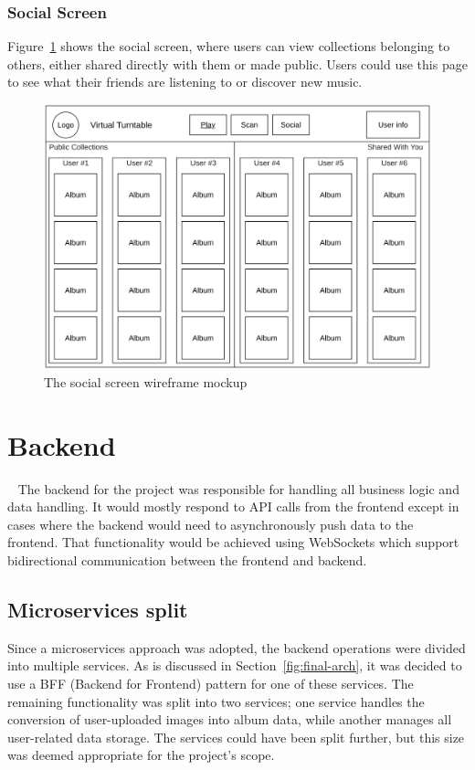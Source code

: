 \subsubsection{Social Screen}
Figure~\ref{fig:social_screen_mockup} shows the social screen, where users can view collections belonging to others, either shared directly with them or made public. Users could use this page to see what their friends are listening to or discover new music.

\begin{figure} [H]
    \centering
    \includegraphics[width=0.6\linewidth]{figures/social_screen_mockup.png}
    \caption{The social screen wireframe mockup}
    \label{fig:social_screen_mockup}
\end{figure}

\section{Backend}~\label{sec:backend-design}
The backend for the project was responsible for handling all business logic and data handling. It would mostly respond to API calls from the frontend except in cases where the backend would need to asynchronously push data to the frontend. That functionality would be achieved using WebSockets which support bidirectional communication between the frontend and backend.

\subsection{Microservices split}
Since a microservices approach was adopted, the backend operations were divided into multiple services. As is discussed in Section~\ref{fig:final-arch}, it was decided to use a BFF (Backend for Frontend) pattern for one of these services. The remaining functionality was split into two services; one service handles the conversion of user-uploaded images into album data, while another manages all user-related data storage. The services could have been split further, but this size was deemed appropriate for the project's scope.

